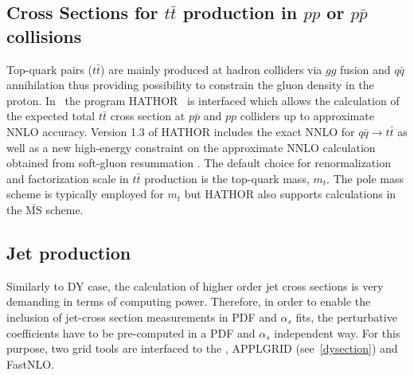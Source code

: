 \subsection{Cross Sections for \texorpdfstring{$t\bar{t}$}{t-tbar} production in $pp$ or $p\bar p$ collisions}
%
Top-quark pairs ($t\bar{t}$) are mainly produced at hadron colliders via $gg$ fusion and
$q \bar q$ annihilation thus providing possibility to constrain the gluon density in the proton. 
In \fitter\ the program HATHOR~\cite{Aliev:2010zk} is interfaced which allows the calculation of 
the expected total $t \bar t$ cross section at 
$p \bar p$ and $p p$ colliders up to approximate NNLO accuracy.
Version 1.3 of HATHOR includes the exact NNLO for $q \bar q \to t \bar t$ \cite{Baernreuther:2012ws}
as well as a new high-energy constraint on the approximate NNLO calculation obtained from
soft-gluon resummation \cite{Moch:2012mk}.
The default choice for renormalization and factorization scale in $t \bar t$ production is the top-quark mass, $m_t$.
The pole mass scheme is typically employed for $m_t$ but HATHOR also supports calculations in
the $\overline{\text{MS}}$ scheme.

\subsection{Jet production}

Similarly to DY case, the calculation of higher order jet cross sections 
is very demanding in terms of computing power. 
Therefore, in order to enable the inclusion of jet-cross section 
measurements in PDF and $\alpha_s$ fits, the perturbative
coefficients have to be pre-computed in a PDF and $\alpha_s$ 
independent way. For this purpose, two grid tools are
interfaced to the \fitter , APPLGRID (see~\ref{dysection}) and 
FastNLO.


